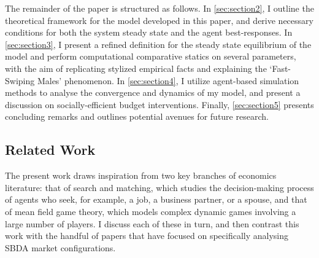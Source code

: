 The remainder of the paper is structured as follows. In \autoref{sec:section2}, I outline the theoretical framework for the model developed in this paper, and derive necessary conditions for both the system steady state and the agent best-responses. In \autoref{sec:section3}, I present a refined definition for the steady state equilibrium of the model and perform computational comparative statics on several parameters, with the aim of replicating stylized empirical facts and explaining the `Fast-Swiping Males' phenomenon. In \autoref{sec:section4}, I utilize agent-based simulation methods to analyse the convergence and dynamics of my model, and present a discussion on socially-efficient budget interventions. Finally, \autoref{sec:section5} presents concluding remarks and outlines potential avenues for future research.

\subsection{Related Work}
The present work draws inspiration from two key branches of economics literature: that of search and matching, which studies the decision-making process of agents who seek, for example, a job, a business partner, or a spouse, and that of mean field game theory, which models complex dynamic games involving a large number of players. I discuss each of these in turn, and then contrast this work with the handful of papers that have focused on specifically analysing SBDA market configurations.

